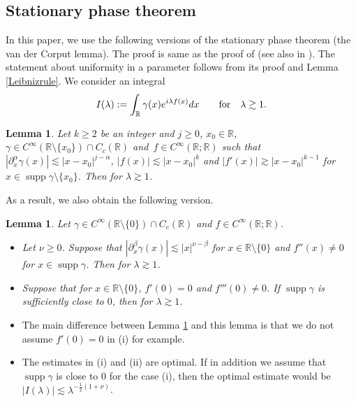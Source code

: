 \documentclass[10pt,a4paper]{article}
\numberwithin{equation}{section}
\newtheorem{Lemma}[Theorem]{Lemma}
\def\R{\mathbb{R}}%
\DeclareMathOperator{\supp}{supp}%
\def\a{\alpha}
\def\b{\beta}
\def\c{\gamma}
\def\l{\lambda}
\def\n{\nu}
\def\pa{\partial}
\begin{document}
\subsection{Stationary phase theorem}

In this paper, we use the following versions of the stationary phase theorem (the van der Corput lemma). The proof is same as the proof of \cite[Lemma 1.1.2]{So} (see also in \cite[p.~334]{S}). The statement about uniformity in a parameter follows from its proof and Lemma \ref{Leibnizrule}. We consider an integral
\begin{align*}
I(\l):=\int_{\R}\c(x){\rm e}^{{\rm i}\l f(x)}{\rm d}x\qquad \text{for}\quad \l\gtrsim 1.
\end{align*}

\begin{Lemma}\label{stphaselem}
Let $k\geq 2$ be an integer and $j\geq 0$, $x_0\in \R$, $\c\in C^{\infty}(\R\setminus \{x_0\})\cap C_c(\R)$ and~${f\in C^{\infty}(\R;\R)}$ such that $|\pa_x^{\a}\c(x)|\lesssim |x-x_0|^{j-\a}$, $|f(x)|\lesssim |x-x_0|^k$ and $|f'(x)|\gtrsim |x-x_0|^{k-1}$ for $x\in \supp \c\setminus \{x_0\}$.
Then \smash{$|I(\l)|\lesssim \l^{-\frac{j+1}{k}}$} for $\l\gtrsim 1$.
\end{Lemma}

As a result, we also obtain the following version.

\begin{Lemma}\label{stphaselem2}
Let $\c\in C^{\infty}(\R\setminus \{0\})\cap C_c(\R)$ and $f\in C^{\infty}(\R;\R)$.
\begin{itemize}\itemsep=0pt
\item[$(i)$] Let $\n\geq 0$. Suppose that $|\pa_x^{\b}\c(x)|\lesssim |x|^{\n-\b}$ for $x\in \R\setminus\{0\}$ and $f''(x)\neq 0$ for $x\in \supp \c$. Then \smash{$|I(\l)|\lesssim \l^{-\frac{1}{2}}$} for $\l\gtrsim 1$.

\item[$(ii)$] Suppose that \smash{$\big|\pa_x^{\b}\c(x)\big|\lesssim |x|^{\frac{1}{2}-\b}$} for $x\in \R\setminus\{0\}$, $f'(0)=0$ and $f'''(0)\neq 0$. If $\supp \c$ is sufficiently close to $0$, then \smash{$|I(\l)|\lesssim \l^{-\frac{1}{2}}$} for $\l\gtrsim 1$.
\end{itemize}
\end{Lemma}

\begin{Remark}\quad
\begin{itemize}\itemsep=0pt
\item[(1)] The main difference between Lemma \ref{stphaselem} and this lemma is that we do not assume $f'(0)=0$ in (i) for example.
\item[(2)] The estimates in (i) and (ii) are optimal. If in addition we assume that $\supp \c$ is close to $0$ for the case (i), then the optimal estimate would be $|I(\l)|\lesssim \l^{-\frac{1}{2}(1+\n)}$.
 \end{itemize}
\end{Remark}
\end{document}
